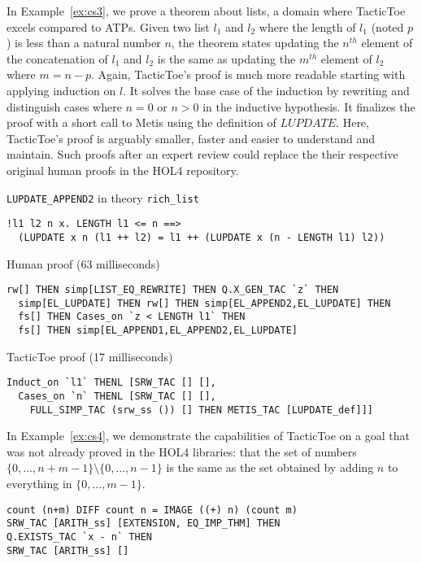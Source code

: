 \documentclass[runningheads,a4paper,draft]{svjour3}
\def\holfour{\textsf{HOL4}\xspace}
\def\metis{\textsf{Metis}\xspace}
\def\tactictoe{\textsf{TacticToe}\xspace}
\begin{document}
In Example~\ref{ex:cs3}, we prove a theorem about lists, a domain where \tactictoe excels compared to ATPs.
Given two list $l_1$ and $l_2$ where the length of $l_1$ (noted $p$) is less
than a natural
number $n$, the theorem states updating the $n^{th}$
element of the concatenation of $l_1$ and $l_2$ is the same as
updating the $m^{th}$ element of $l_2$ where $m = n - p$. Again,
\tactictoe's proof is
much more readable starting with applying induction on $l$. It solves the base
case of the induction by rewriting and distinguish cases where $n=0$ or $n>0$
in the inductive hypothesis. It finalizes the proof with a short call to \metis
using the definition of
$LUPDATE$. Here, \tactictoe's proof is arguably smaller, faster and easier to
understand and maintain. Such proofs after an expert review could replace the
their respective original human proofs in the \holfour repository.

\begin{example}\label{ex:cs3} \texttt{LUPDATE\_APPEND2} in theory
\texttt{rich\_list}
\begin{lstlisting}[language=SMLSmall]
!l1 l2 n x. LENGTH l1 <= n ==>
  (LUPDATE x n (l1 ++ l2) = l1 ++ (LUPDATE x (n - LENGTH l1) l2))
\end{lstlisting}
Human proof (63 milliseconds)
\begin{lstlisting}[language=SMLSmall]
  rw[] THEN simp[LIST_EQ_REWRITE] THEN Q.X_GEN_TAC `z` THEN
  simp[EL_LUPDATE] THEN rw[] THEN simp[EL_APPEND2,EL_LUPDATE] THEN
  fs[] THEN Cases_on `z < LENGTH l1` THEN
  fs[] THEN simp[EL_APPEND1,EL_APPEND2,EL_LUPDATE]
\end{lstlisting}
\tactictoe proof (17 milliseconds)
\begin{lstlisting}[language=SMLSmall]
Induct_on `l1` THENL [SRW_TAC [] [],
  Cases_on `n` THENL [SRW_TAC [] [],
    FULL_SIMP_TAC (srw_ss ()) [] THEN METIS_TAC [LUPDATE_def]]]
\end{lstlisting}
\end{example}

In Example~\ref{ex:cs4}, we demonstrate the capabilities of \tactictoe on a goal that was not already proved in the \holfour libraries: that the set of numbers $\{0,...,n+m-1\} \setminus \{0,...,n-1\}$ is the same as the set obtained by adding $n$ to everything in $\{0,...,m-1\}$.

\begin{example}\label{ex:cs4}
\begin{lstlisting}[language=SMLSmall]
count (n+m) DIFF count n = IMAGE ((+) n) (count m)
SRW_TAC [ARITH_ss] [EXTENSION, EQ_IMP_THM] THEN
Q.EXISTS_TAC `x - n` THEN
SRW_TAC [ARITH_ss] []
\end{lstlisting}
\end{example}
\end{document}
